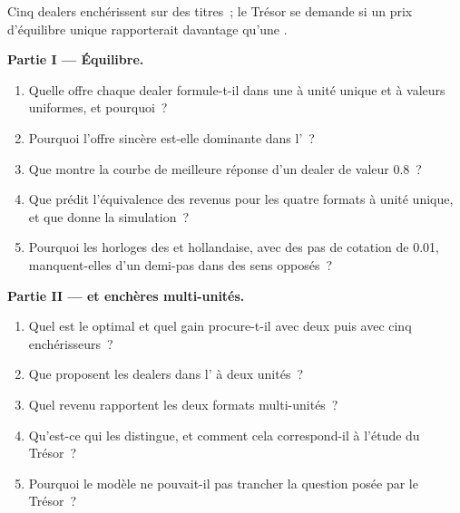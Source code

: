 \begin{problem}\label{pb:qm:games-auctions-and-information:1}
Cinq dealers enchérissent sur des titres~; le Trésor se demande si un prix d'équilibre unique rapporterait davantage qu'une .

\medskip\noindent\textbf{Partie I --- Équilibre.}
\begin{enumerate}
\item Quelle offre chaque dealer formule-t-il dans une  à unité unique et à valeurs uniformes, et pourquoi~?
\item Pourquoi l'offre sincère est-elle dominante dans l'~?
\item Que montre la courbe de meilleure réponse d'un dealer de valeur 0.8~?
\item Que prédit l'équivalence des revenus pour les quatre formats à unité unique, et que donne la simulation~?
\item Pourquoi les horloges des  et hollandaise, avec des pas de cotation de 0.01, manquent-elles d'un demi-pas dans des sens opposés~?
\end{enumerate}

\medskip\noindent\textbf{Partie II ---  et enchères multi-unités.}
\begin{enumerate}[resume]
\item Quel est le  optimal et quel gain procure-t-il avec deux puis avec cinq enchérisseurs~?
\item Que proposent les dealers dans l' à deux unités~?
\item Quel revenu rapportent les deux formats multi-unités~?
\item Qu'est-ce qui les distingue, et comment cela correspond-il à l'étude du Trésor~?
\item Pourquoi le modèle ne pouvait-il pas trancher la question posée par le Trésor~?
\end{enumerate}


\end{problem}
